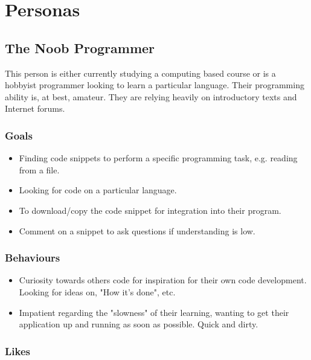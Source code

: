 \documentclass[11pt,a4paper]{article}
\begin{document}
\newpage

\section{Personas}

\subsection{The Noob Programmer}

This person is either currently studying a computing based course or is a
hobbyist programmer looking to learn a particular language. Their programming
ability is, at best, amateur. They are relying heavily on introductory texts
and Internet forums.

\subsubsection{Goals}

\begin{itemize}
\item Finding code snippets to perform a specific programming task,
e.g. reading from a file.
\item Looking for code on a particular language.
\item To download/copy the code snippet for integration into their
program.
\item Comment on a snippet to ask questions if understanding is low.
\end{itemize}

\subsubsection{Behaviours}

\begin{itemize}
\item Curiosity towards others code for inspiration for their own code
development. Looking for ideas on, "How it's done", etc.
\item Impatient regarding the "slowness" of their learning, wanting to
get their application up and running as soon as possible. Quick and
dirty.
\end{itemize}

\subsubsection{Likes}
\end{document}
